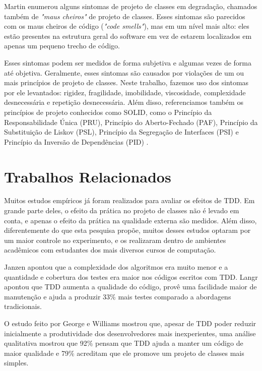 \documentclass[conference]{IEEEtran}
\begin{document}
Martin \cite{bob-martin} enumerou alguns sintomas de projeto de classes em degradação, 
chamados também de \textit{"maus cheiros"} de projeto de classes. Esses sintomas são parecidos com os 
maus cheiros de código (\textit{"code smells"}), mas em um nível mais alto: eles
estão presentes na estrutura geral do software em vez de estarem localizados
em apenas um pequeno trecho de código.

Esses sintomas podem ser medidos de forma subjetiva e algumas vezes de forma 
até objetiva. Geralmente, esses sintomas são causados por violações de um ou 
mais princípios de projeto de classes.
Neste trabalho, fazemos uso dos sintomas por ele levantados: rigidez, fragilidade, imobilidade, 
viscosidade, complexidade desnecessária e repetição desnecessária. Além disso, referenciamos também
os princípios de projeto conhecidos como SOLID, 
como o Princípio da Responsabilidade Única (PRU), Princípio do Aberto-Fechado (PAF),
Princípio da Substituição de Liskov (PSL), Princípio da Segregação de Interfaces (PSI) e Princípio da
Inversão de Dependências (PID) \cite{bob-martin}.

\section{Trabalhos Relacionados}
\label{cap:trabalhos-relacionados}

Muitos estudos empíricos já foram realizados para avaliar os efeitos de TDD.
Em grande parte deles, o efeito da prática no projeto de classes não é 
levado em conta, e apenas o efeito da prática na qualidade externa são medidos.
Além disso, diferentemente
do que esta pesquisa propõe, muitos desses estudos optaram por um
maior controle no experimento, e os realizaram dentro de ambientes acadêmicos 
com estudantes dos mais diversos cursos de computação.

Janzen \cite{janzen-arch-improvement} 
apontou que a complexidade dos algoritmos era muito menor e a quantidade e
cobertura dos testes era maior nos códigos escritos com TDD.
Langr \cite{langr} apontou que TDD aumenta a qualidade do código, provê uma 
facilidade maior de manutenção e ajuda a produzir 33\% mais testes comparado a
abordagens tradicionais.

O estudo feito por George e Williams \cite{george-e-williams} mostrou que,
apesar de TDD poder reduzir inicialmente a produtividade dos desenvolvedores 
mais inexperientes, uma análise
qualitativa mostrou que 92\% pensam que TDD ajuda a manter um
código de maior qualidade e 79\% acreditam que ele promove um projeto 
de classes mais simples.
\end{document}
